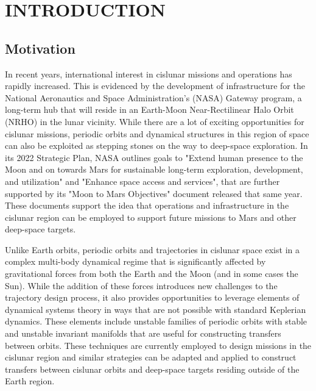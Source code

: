 \chapter{INTRODUCTION}
\section{Motivation}\label{sec:Motivation}
In recent years, international interest in cislunar missions and operations has rapidly increased.
This is evidenced by the development of infrastructure for the National Aeronautics and Space
Administration's (NASA) Gateway program, a long-term hub that will reside in an Earth-Moon
Near-Rectilinear Halo Orbit (NRHO) in the lunar vicinity\cite{Zamora:2024}. While there are a lot
of exciting opportunities for cislunar missions, periodic orbits and dynamical structures in this
region of space can also be exploited as stepping stones on the way to deep-space exploration. In
its 2022 Strategic Plan, NASA outlines goals to "Extend human presence to the Moon and on towards
Mars for sustainable long-term exploration, development, and utilization" and "Enhance space access
and services"\cite{NASA:2022s}, that are further supported by its "Moon to Mars Objectives"
document released that same year\cite{NASA:2022m}. These documents support the idea that operations
and infrastructure in the cislunar region can be employed to support future missions to Mars and
other deep-space targets.

Unlike Earth orbits, periodic orbits and trajectories in cislunar space exist in a complex
multi-body dynamical regime that is significantly affected by gravitational forces from both the
Earth and the Moon (and in some cases the Sun). While the addition of these forces introduces new
challenges to the trajectory design process, it also provides opportunities to leverage elements of
dynamical systems theory in ways that are not possible with standard Keplerian dynamics. These
elements include unstable families of periodic orbits with stable and unstable invariant manifolds
that are useful for constructing transfers between orbits. These techniques are currently employed
to design missions in the cislunar region and similar strategies can be adapted and applied to
construct transfers between cislunar orbits and deep-space targets residing outside of the Earth
region.

